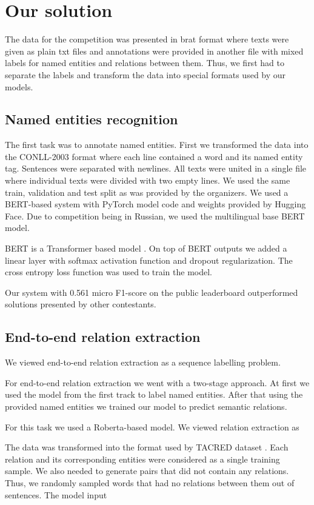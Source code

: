 \documentclass{dialogue}
\begin{document}
\section{Our solution}
The data for the competition was presented in brat format \cite{brat} where texts were given as plain txt files and annotations were provided in another file with mixed labels for named entities and relations between them. Thus, we first had to separate the labels and transform the data into special formats used by our models.
\subsection{Named entities recognition}
The first task was to annotate named entities. First we transformed the data into the CONLL-2003 format where each line contained a word and its named entity tag. Sentences were separated with newlines. All texts were united in a single file where individual texts were divided with two empty lines. We used the same train, validation and test split as was provided by the organizers. We used a BERT-based system \cite{bert} with PyTorch model code and weights provided by Hugging Face. Due to competition being in Russian, we used the multilingual base BERT model.

BERT is a Transformer based model \cite{attention}. On top of BERT outputs we added a linear layer with softmax activation function and dropout regularization. The cross entropy loss function was used to train the model.

Our system with 0.561 micro F1-score on the public leaderboard outperformed solutions presented by other contestants.
\subsection{End-to-end relation extraction}
We viewed end-to-end relation extraction as a sequence labelling problem.

For end-to-end relation extraction we went with a two-stage approach. At first we used the model from the first track to label named entities. After that using the provided named entities we trained our model to predict semantic relations.

For this task we used a Roberta-based model. We viewed relation extraction as 

The data was transformed into the format used by TACRED dataset \cite{tacred}. Each relation and its corresponding entities were considered as a single training sample. We also needed to generate pairs that did not contain any relations. Thus, we randomly sampled words that had no relations between them out of sentences. The model input
\end{document}
